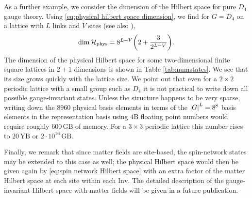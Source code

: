 \medskip

As a further example, we consider the dimension of the Hilbert space for pure $D_4$ gauge theory.
Using \eqref{eq:physical hilbert space dimension}, we find for $G=D_4$ on a lattice with $L$ links and $V$ sites (see also \cite{marchesethesis}),
\begin{equation}
    \dim{\HilbertPhys} = 8^{L-V}\pqty{2+\frac{3}{2^{L-V}}}.
\end{equation}
The dimension of the physical Hilbert space for some two-dimensional finite square lattices in $2+1$ dimensions is shown in Table \ref{tab:numstates}.
We see that its size grows quickly with the lattice size.
We point out that even for a $2 \times 2$ periodic lattice with a small group such as $D_4$ it is not practical to write down all possible gauge-invariant states.
Unless the structure happens to be very sparse, writing down the $8960$ physical basis elements in terms of the $\abs{G}^L = 8^8$ basis elements in the representation basis using $4 \mathrm{B}$ floating point numbers would require roughly $600 \,\mathrm{GB}$ of memory.
For a  $3 \times 3$ periodic lattice this number rises to $20\, \mathrm{YB}$ or $2 \cdot 10^{16}\, \mathrm{GB}$.


Finally, we remark that since matter fields are site-based, the spin-network states may be extended to this case as well; the physical Hilbert space would then be given again by \eqref{eq:spin network Hilbert space} with an extra factor of the matter Hilbert space at each site within each $\mathrm{Inv}$. The detailed description of the gauge-invariant Hilbert space with matter fields will be given in a future publication.


